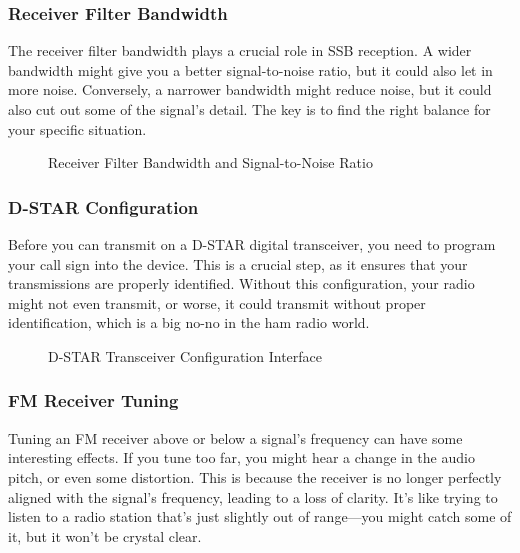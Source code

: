 \subsubsection*{Receiver Filter Bandwidth}

The receiver filter bandwidth plays a crucial role in SSB reception. A wider bandwidth might give you a better signal-to-noise ratio, but it could also let in more noise. Conversely, a narrower bandwidth might reduce noise, but it could also cut out some of the signal’s detail. The key is to find the right balance for your specific situation.

\begin{figure}[h]
    \centering
    \caption{Receiver Filter Bandwidth and Signal-to-Noise Ratio}
    \label{fig:filter-bandwidth}
\end{figure}

\subsubsection*{D-STAR Configuration}

Before you can transmit on a D-STAR digital transceiver, you need to program your call sign into the device. This is a crucial step, as it ensures that your transmissions are properly identified. Without this configuration, your radio might not even transmit, or worse, it could transmit without proper identification, which is a big no-no in the ham radio world.

\begin{figure}[h]
    \centering
    \caption{D-STAR Transceiver Configuration Interface}
    \label{fig:dstar-config}
\end{figure}

\subsubsection*{FM Receiver Tuning}

Tuning an FM receiver above or below a signal’s frequency can have some interesting effects. If you tune too far, you might hear a change in the audio pitch, or even some distortion. This is because the receiver is no longer perfectly aligned with the signal’s frequency, leading to a loss of clarity. It’s like trying to listen to a radio station that’s just slightly out of range—you might catch some of it, but it won’t be crystal clear.

